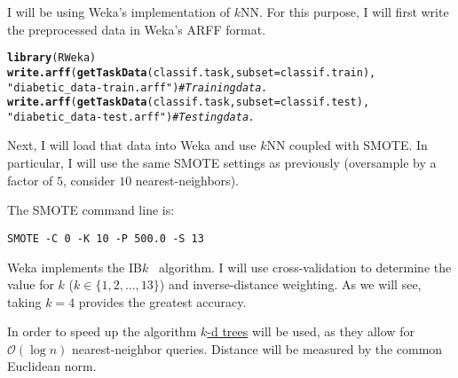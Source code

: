 \documentclass{article}\usepackage[]{graphicx}\usepackage[]{color}
\makeatletter
\newcommand{\hlstr}[1]{\textcolor[rgb]{0.192,0.494,0.8}{#1}}%
\newcommand{\hlcom}[1]{\textcolor[rgb]{0.678,0.584,0.686}{\textit{#1}}}%
\newcommand{\hlstd}[1]{\textcolor[rgb]{0.345,0.345,0.345}{#1}}%
\newcommand{\hlkwc}[1]{\textcolor[rgb]{0.333,0.667,0.333}{#1}}%
\newcommand{\hlkwd}[1]{\textcolor[rgb]{0.737,0.353,0.396}{\textbf{#1}}}%
\newenvironment{kframe}{%
 \def\at@end@of@kframe{}%
 \ifinner\ifhmode%
  \def\at@end@of@kframe{\end{minipage}}%
  \begin{minipage}{\columnwidth}%
 \fi\fi%
 \def\FrameCommand##1{\hskip\@totalleftmargin \hskip-\fboxsep
 \colorbox{shadecolor}{##1}\hskip-\fboxsep
     \hskip-\linewidth \hskip-\@totalleftmargin \hskip\columnwidth}%
 \MakeFramed {\advance\hsize-\width
   \@totalleftmargin\z@ \linewidth\hsize
   \@setminipage}}%
 {\par\unskip\endMakeFramed%
 \at@end@of@kframe}
\newenvironment{knitrout}{}{} %
\makeatother
\begin{document}
I will be using Weka's implementation of $k$NN.  For this purpose, I will first
write the preprocessed data in Weka's ARFF format.
\begin{knitrout}
\color{fgcolor}\begin{kframe}
\begin{alltt}
\hlkwd{library}\hlstd{(RWeka)}
\hlkwd{write.arff}\hlstd{(}\hlkwd{getTaskData}\hlstd{(classif.task,} \hlkwc{subset}\hlstd{=classif.train),}
           \hlstr{"diabetic_data-train.arff"}\hlstd{)}  \hlcom{# Training data.}
\hlkwd{write.arff}\hlstd{(}\hlkwd{getTaskData}\hlstd{(classif.task,} \hlkwc{subset}\hlstd{=classif.test),}
           \hlstr{"diabetic_data-test.arff"}\hlstd{)}   \hlcom{# Testing data.}
\end{alltt}
\end{kframe}
\end{knitrout}

Next, I will load that data into Weka and use $k$NN coupled with SMOTE.  In
particular, I will use the same SMOTE settings as previously (oversample by a
factor of $5$, consider $10$ nearest-neighbors).

The SMOTE command line is:
\begin{verbatim}
SMOTE -C 0 -K 10 -P 500.0 -S 13
\end{verbatim}

Weka implements the IB$k$~\autocite{AK91} algorithm.  I will use
cross-validation to determine the value for $k$ ($k \in \{1, 2, \ldots, 13\}$)
and inverse-distance weighting.  As we will see, taking $k = 4$ provides the
greatest accuracy.

In order to speed up the algorithm
\href{https://en.wikipedia.org/wiki/K-d_tree}{$k$-d trees} will be used, as they
allow for $\mathcal O(\log n)$ nearest-neighbor queries.  Distance will be
measured by the common Euclidean norm.
\end{document}
